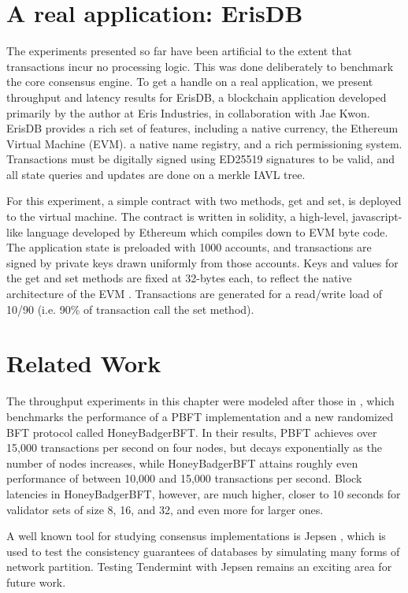 \ifx
\section{A real application: ErisDB}

The experiments presented so far have been artificial to the extent that transactions incur no processing logic.
This was done deliberately to benchmark the core consensus engine. 
To get a handle on a real application, we present throughput and latency results for ErisDB, 
a blockchain application developed primarily by the author at Eris Industries, in collaboration with Jae Kwon.
ErisDB provides a rich set of features, including a native currency, the Ethereum Virtual Machine (EVM).
a native name registry, and a rich permissioning system.
Transactions must be digitally signed using ED25519 signatures to be valid, and all state queries and updates are done on a merkle IAVL tree.

For this experiment, a simple contract with two methods, get and set, is deployed to the virtual machine.
The contract is written in solidity, a high-level, javascript-like language developed by Ethereum which compiles down to EVM byte code.
The application state is preloaded with 1000 accounts, and transactions are signed by private keys drawn uniformly from those accounts.
Keys and values for the get and set methods are fixed at 32-bytes each, to reflect the native architecture of the EVM \cite{ethereum_yellow_paper}.
Transactions are generated for a read/write load of 10/90 (i.e. 90\% of transaction call the set method).

\fi

\section{Related Work}

The throughput experiments in this chapter were modeled after those in \cite{honeybadger},
which benchmarks the performance of a PBFT implementation 
and a new randomized BFT protocol called HoneyBadgerBFT.
In their results, PBFT achieves over 15,000 transactions per second on four nodes,
but decays exponentially as the number of nodes increases, 
while HoneyBadgerBFT attains roughly even performance
of between 10,000 and 15,000 transactions per second.
Block latencies in HoneyBadgerBFT, however, are much higher, 
closer to 10 seconds for validator sets of size 8, 16, and 32, and even more for larger ones.

A well known tool for studying consensus implementations is Jepsen \cite{jepsen},
which is used to test the consistency guarantees of databases by simulating 
many forms of network partition. 
Testing Tendermint with Jepsen remains an exciting area for future work.

